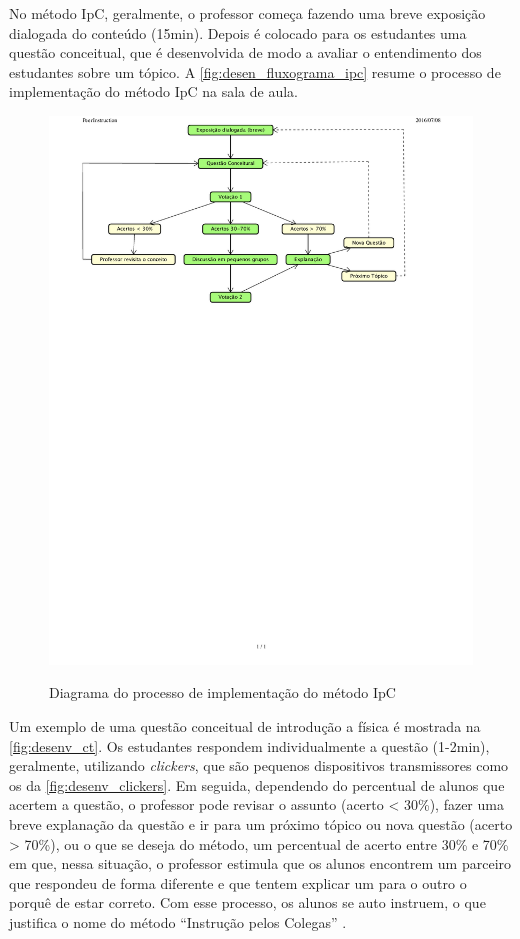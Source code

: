 No método IpC, geralmente, o professor começa fazendo uma breve exposição dialogada do conteúdo (15min).
Depois é colocado para os estudantes uma questão conceitual, que é
desenvolvida de modo a avaliar o entendimento dos estudantes sobre um tópico.
A \autoref{fig:desen_fluxograma_ipc} resume o processo de implementação do método IpC na sala de aula.

\begin{figure}[b]
  \centering
  \caption{Diagrama do processo de implementação do método IpC}
  \includegraphics[clip, trim=0cm 18cm 3cm .4cm, width=.85\textwidth]{imagens/peer_instruction}
  \label{fig:desen_fluxograma_ipc}
\end{figure}

Um exemplo de uma questão conceitual de introdução a física é mostrada na \autoref{fig:desenv_ct}. Os
estudantes respondem individualmente  a questão (1-2min), geralmente, utilizando
\textit{clickers}, que são pequenos dispositivos transmissores como os da \autoref{fig:desenv_clickers}.
Em seguida, dependendo do percentual de alunos que acertem a questão,
o professor pode revisar o assunto (acerto < 30\%), fazer uma breve explanação da
questão e ir para um próximo tópico ou nova questão (acerto > 70\%), ou o que se
deseja do método, um percentual de acerto entre 30\% e 70\% em que, nessa situação, o
professor estimula que os alunos encontrem um parceiro que respondeu de forma diferente
e que tentem explicar um para o outro o porquê de estar correto. Com esse processo, os alunos se auto
instruem, o que justifica o nome do método ``Instrução pelos Colegas'' \cite{Mazur2009, Crouch2001}.


